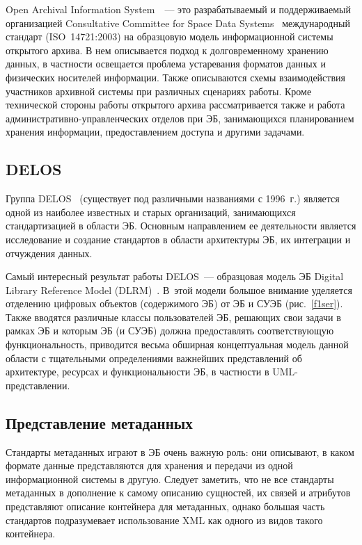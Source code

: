 \begin{multicols}{2}
  Open Archival Information System~\cite{14ser}~--- это разрабатываемый и поддерживаемый 
организацией Consultative Committee for Space Data Systems~\cite{9ser} международный 
стандарт (ISO~14721:2003) на образцовую модель информационной системы открытого 
архива. В нем описывается подход к долговременному хранению данных, в частности 
освещается проблема устаревания форматов данных и физических носителей информации. 
Также описываются схемы взаимодействия участников архивной системы при различных 
сценариях работы. Кроме технической стороны работы открытого архива рассматривается 
также и работа ад\-ми\-ни\-ст\-ра\-тив\-но-управ\-лен\-че\-ских отделов при ЭБ, 
занимающихся планированием хранения информации, предоставлением доступа и другими 
задачами.

\vspace*{-12pt}
  
  \subsection*{DELOS}
  
  Группа DELOS~\cite{10ser} (существует под различными названиями с 1996~г.) является 
одной из наиболее известных и старых организаций, занимающихся стандартизацией в 
области ЭБ. Основным на\-прав\-ле\-ни\-ем ее деятельности является исследование и создание 
стандартов в области архитектуры ЭБ, их интеграции и отчуждения данных.
  
  Самый интересный результат работы DELOS~--- образцовая модель ЭБ Digital Library 
Reference Model (DLRM)~\cite{15ser}. В~этой модели большое внимание уделяется 
отделению цифровых объектов (содержимого ЭБ) от ЭБ и СУЭБ (рис.~\ref{f1ser}). 
Также вводятся различные классы пользователей ЭБ, решающих свои задачи в рамках ЭБ и 
которым ЭБ (и СУЭБ) должна предоставлять соответствующую функциональность, 
приводится весьма обширная концептуальная модель данной области с тщательными 
определениями важнейших представлений об архитектуре, ресурсах и функциональности 
ЭБ, в частности в UML-представлении.



\vspace*{-6pt}

\subsection{Представление метаданных}
  
  Стандарты метаданных играют в ЭБ очень важную роль: они описывают, в каком формате 
данные представляются для хранения и передачи из одной информационной системы в 
другую. Следует заметить, что не все стандарты метаданных в дополнение к самому 
описанию сущностей, их связей и атрибутов представляют описание контейнера для 
метаданных, однако большая часть стандартов подразумевает использование XML как 
одного из видов такого контейнера. 
  


\end{multicols}

